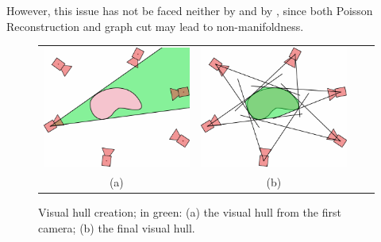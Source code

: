 However, this issue has not be faced neither by \cite{fu10} and by \cite{labatut2007efficient,vu_et_al_2012}, since both Poisson Reconstruction and graph cut may lead to non-manifoldness.


\begin{figure}[t]
\centering
 \begin{tabular}{cccc}
  \includegraphics[width=0.45\columnwidth]{./img/ch_soa/visualhull01}&
  \includegraphics[width=0.45\columnwidth]{./img/ch_soa/visualhull02}\\
  (a)&(b)
 \end{tabular}
 \caption{Visual hull creation; in green: (a) the visual hull from the first camera; (b) the final visual hull.}
 \label{fig:visualhull}
\end{figure}

